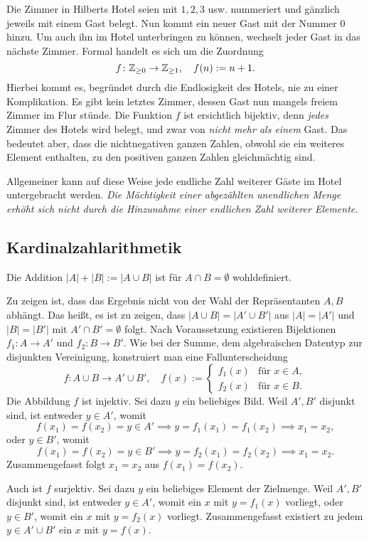 Die Zimmer in Hilberts Hotel seien mit $1, 2, 3$ usw. nummeriert
und gänzlich jeweils mit einem Gast belegt. Nun kommt ein neuer Gast
mit der Nummer $0$ hinzu. Um auch ihn im Hotel unterbringen zu können,
wechselt jeder Gast in das nächste Zimmer. Formal handelt es sich
um die Zuordnung
\[f\colon\mathbb Z_{\ge 0}\to\mathbb Z_{\ge 1},\quad f(n) := n + 1.\]
Hierbei kommt es, begründet durch die Endlosigkeit des Hotels, nie zu
einer Komplikation. Es gibt kein letztes Zimmer, dessen Gast nun mangels
freiem Zimmer im Flur stünde. Die Funktion $f$ ist ersichtlich bijektiv,
denn \emph{jedes} Zimmer des Hotels wird belegt, und zwar von
\emph{nicht mehr als einem} Gast. Das bedeutet aber, dass die
nichtnegativen ganzen Zahlen, obwohl sie ein weiteres Element enthalten,
zu den positiven ganzen Zahlen gleichmächtig sind.

Allgemeiner kann auf diese Weise jede endliche Zahl weiterer
Gäste im Hotel untergebracht werden. \emph{Die Mächtigkeit einer abgezählten
unendlichen Menge erhöht sich nicht durch die Hinzunahme einer
endlichen Zahl weiterer Elemente.}

\subsection{Kardinalzahlarithmetik}

\begin{Satz}
Die Addition $|A|+|B|:=|A\cup B|$ ist für $A\cap B=\emptyset$ wohldefiniert.
\end{Satz}
\begin{Beweis}
Zu zeigen ist, dass das Ergebnis nicht von der Wahl der Repräsentanten
$A,B$ abhängt. Das heißt, es ist zu zeigen, dass $|A\cup B|=|A'\cup B'|$
aus $|A|=|A'|$ und $|B|=|B'|$ mit $A'\cap B'=\emptyset$ folgt. Nach
Voraussetzung existieren Bijektionen $f_1\colon A\to A'$ und
$f_2\colon B\to B'$. Wie bei der Summe, dem algebraischen Datentyp
zur disjunkten Vereinigung, konstruiert man eine Fallunterscheidung
\[f\colon A\cup B\to A'\cup B',\quad f(x) :=
\begin{cases}
f_1(x) & \text{für $x\in A$},\\
f_2(x) & \text{für $x\in B$}.
\end{cases}\]
Die Abbildung $f$ ist injektiv. Sei dazu $y$ ein beliebiges Bild.
Weil $A',B'$ disjunkt sind, ist entweder $y\in A'$, womit
\[f(x_1)=f(x_2)=y\in A' \implies y=f_1(x_1)=f_1(x_2)\implies x_1=x_2,\]
oder $y\in B'$, womit
\[f(x_1)=f(x_2)=y\in B' \implies y=f_2(x_1)=f_2(x_2)\implies x_1=x_2. \]
Zusammengefasst folgt $x_1=x_2$ aus $f(x_1)=f(x_2)$.

Auch ist $f$ surjektiv. Sei dazu $y$ ein beliebiges Element der Zielmenge.
Weil $A',B'$ disjunkt sind, ist entweder $y\in A'$, womit ein $x$ mit
$y=f_1(x)$ vorliegt, oder $y\in B'$, womit ein $x$ mit $y=f_2(x)$
vorliegt. Zusammengefasst existiert zu jedem $y\in A'\cup B'$ ein $x$
mit $y=f(x)$.\,\qedsymbol
\end{Beweis}

